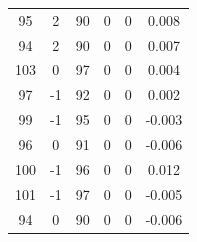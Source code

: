 \documentclass[a4paper, 12pt]{article}
\begin{document}
\begin{table}[H]
\begin{tabular}{@{}cccccc@{}}
    95                    & 2                     & 90                & 0                 & 0                 & 0.008               \\
    94                    & 2                     & 90                & 0                 & 0                 & 0.007               \\
    103                   & 0                     & 97                & 0                 & 0                 & 0.004               \\
    97                    & -1                    & 92                & 0                 & 0                 & 0.002               \\
    99                    & -1                    & 95                & 0                 & 0                 & -0.003              \\
    96                    & 0                     & 91                & 0                 & 0                 & -0.006              \\
    100                   & -1                    & 96                & 0                 & 0                 & 0.012               \\
    101                   & -1                    & 97                & 0                 & 0                 & -0.005              \\
    94                    & 0                     & 90                & 0                 & 0                 & -0.006              \\ \bottomrule
    \end{tabular}
    \end{table}
    
\end{document}
